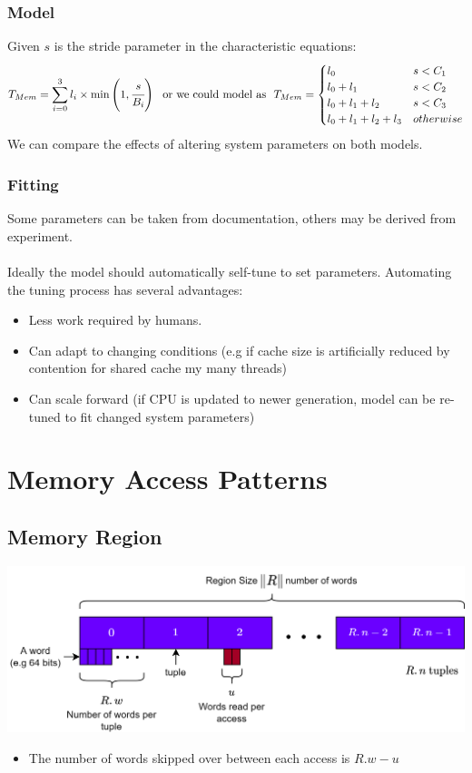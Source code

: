 \subsubsection{Model}
Given $s$ is the stride parameter in the characteristic equations:
\[T_{Mem} = \sum_{i = 0}^3 l_i \times \min\left(1, \cfrac{s}{B_i}\right) \ \text{ or we could model as } \ T_{Mem} = \begin{cases}
    l_0 & s < C_1 \\
    l_0 + l_1 & s < C_2 \\
    l_0 + l_1 + l_2 & s < C_3 \\
    l_0 + l_1 + l_2 + l_3 & otherwise \\
\end{cases}\]
We can compare the effects of altering system parameters on both models.

\subsubsection{Fitting}
Some parameters can be taken from documentation, others may be derived from experiment.
\\
\\ Ideally the model should automatically self-tune to set parameters. Automating the tuning process has several advantages:
\begin{itemize}
    \item Less work required by humans.
    \item Can adapt to changing conditions (e.g if cache size is artificially reduced by contention for shared cache my many threads)
    \item Can scale forward (if CPU is updated to newer generation, model can be re-tuned to fit changed system parameters)
\end{itemize}


\section{Memory Access Patterns}
\subsection{Memory Region}
\begin{center}
    \includegraphics[width=.8\textwidth]{modelling/images/memory_region.drawio.png}
\end{center}
\begin{itemize}
    \item The number of words skipped over between each access is $R.w - u$
\end{itemize}

